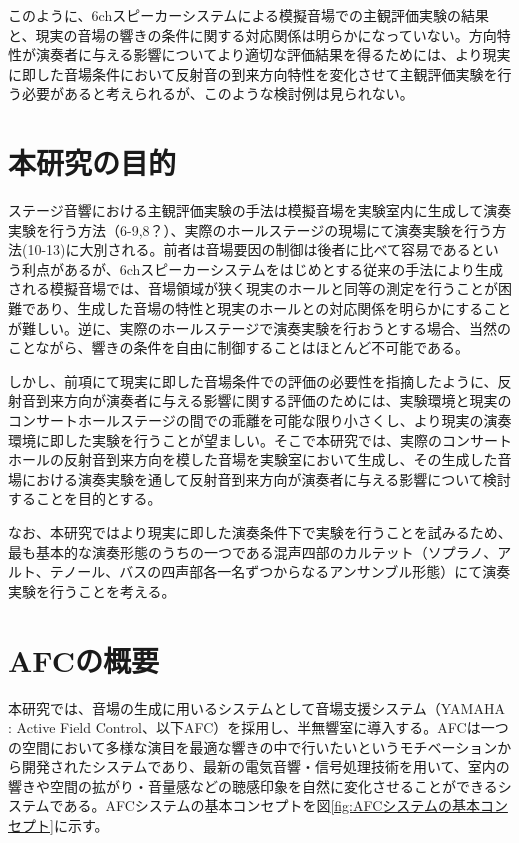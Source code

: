 \documentclass[11pt,a4j]{jreport}
\begin{document}
このように、6chスピーカーシステムによる模擬音場での主観評価実験の結果と、現実の音場の響きの条件に関する対応関係は明らかになっていない。方向特性が演奏者に与える影響についてより適切な評価結果を得るためには、より現実に即した音場条件において反射音の到来方向特性を変化させて主観評価実験を行う必要があると考えられるが、このような検討例は見られない。



\newpage
\section{本研究の目的} %
ステージ音響における主観評価実験の手法は模擬音場を実験室内に生成して演奏実験を行う方法（6-9,8？）、実際のホールステージの現場にて演奏実験を行う方法(10-13)に大別される。前者は音場要因の制御は後者に比べて容易であるという利点があるが、6chスピーカーシステムをはじめとする従来の手法により生成される模擬音場では、音場領域が狭く現実のホールと同等の測定を行うことが困難であり、生成した音場の特性と現実のホールとの対応関係を明らかにすることが難しい。逆に、実際のホールステージで演奏実験を行おうとする場合、当然のことながら、響きの条件を自由に制御することはほとんど不可能である。

しかし、前項にて現実に即した音場条件での評価の必要性を指摘したように、反射音到来方向が演奏者に与える影響に関する評価のためには、実験環境と現実のコンサートホールステージの間での乖離を可能な限り小さくし、より現実の演奏環境に即した実験を行うことが望ましい。そこで本研究では、実際のコンサートホールの反射音到来方向を模した音場を実験室において生成し、その生成した音場における演奏実験を通して反射音到来方向が演奏者に与える影響について検討することを目的とする。

なお、本研究ではより現実に即した演奏条件下で実験を行うことを試みるため、最も基本的な演奏形態のうちの一つである混声四部のカルテット（ソプラノ、アルト、テノール、バスの四声部各一名ずつからなるアンサンブル形態）にて演奏実験を行うことを考える。


\section{AFCの概要} %

本研究では、音場の生成に用いるシステムとして音場支援システム（YAMAHA : Active Field Control、以下AFC）を採用し、半無響室に導入する。AFCは一つの空間において多様な演目を最適な響きの中で行いたいというモチベーションから開発されたシステムであり、最新の電気音響・信号処理技術を用いて、室内の響きや空間の拡がり・音量感などの聴感印象を自然に変化させることができるシステムである\cite{AFC}。AFCシステムの基本コンセプトを図\ref{fig:AFCシステムの基本コンセプト}に示す。
\end{document}
